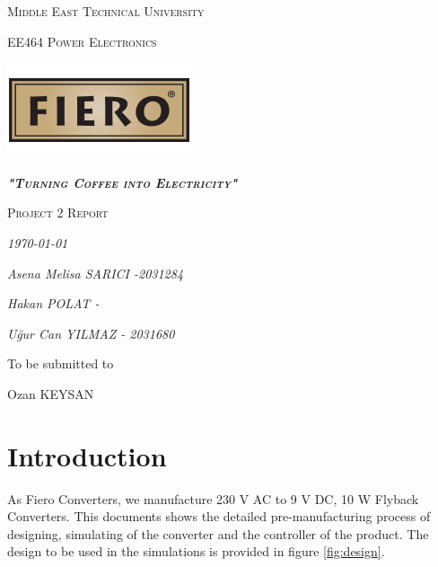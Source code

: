 \documentclass[12pt]{article}
\begin{document}
\begin{titlepage}
	\centering

	{\scshape\LARGE Middle East Technical University \par}
	\vspace{0.2cm}
	{\scshape\LARGE EE464 Power Electronics  \par}
	\vspace{3cm}

    \includegraphics{fiero-logo.png}\par
    {\scshape\LARGE\textit{\textbf{"Turning Coffee into Electricity"}}   \par}
    \vspace{3 cm}
	
	
	{\scshape\LARGE Project 2 Report \par}
	\vspace{1 cm}
	{\Large\itshape \today \par}
		\vspace{0.3 cm}



	
	{\Large\itshape Asena Melisa SARICI -2031284\par}
	\vspace{0.1cm}

	{\Large\itshape Hakan POLAT -\par}
	\vspace{0.1cm}
	
	{\Large\itshape Uğur Can YILMAZ - 2031680  \par}
	\vspace{0.1cm}
	
	
	To be submitted to\par
	{\Large\itshape{Ozan \textsc{KEYSAN}\par}}
	
	

\end{titlepage}


\tableofcontents
\newpage

\newpage
\section{Introduction}

As Fiero Converters, we manufacture 230 V AC to 9 V DC, 10 W Flyback  Converters. This documents shows the detailed pre-manufacturing process of designing, simulating of the converter and the controller of the product. The design to be used in the simulations is provided in figure \ref{fig:design}.
\end{document}
